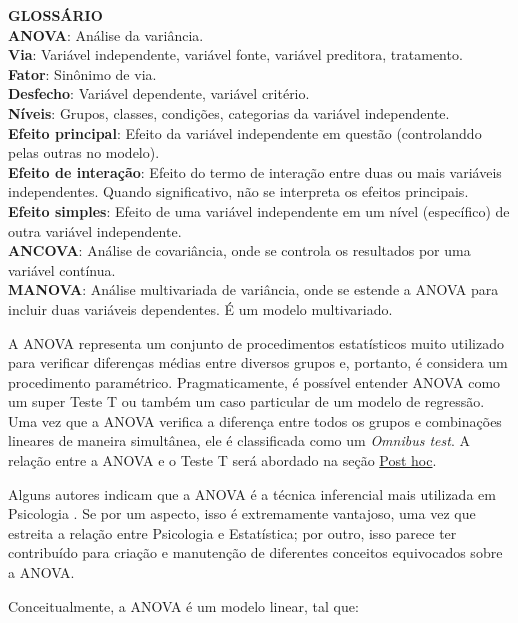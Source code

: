 \documentclass[
]{book}
\begin{document}
\begin{glossario}
\textbf{GLOSSÁRIO}\\
\textbf{ANOVA}: Análise da variância.\\
\textbf{Via}: Variável independente, variável fonte, variável preditora,
tratamento.\\
\textbf{Fator}: Sinônimo de via.\\
\textbf{Desfecho}: Variável dependente, variável critério.\\
\textbf{Níveis}: Grupos, classes, condições, categorias da variável
independente.\\
\textbf{Efeito principal}: Efeito da variável independente em questão
(controlanddo pelas outras no modelo).\\
\textbf{Efeito de interação}: Efeito do termo de interação entre duas ou
mais variáveis independentes. Quando significativo, não se interpreta os
efeitos principais.\\
\textbf{Efeito simples}: Efeito de uma variável independente em um nível
(específico) de outra variável independente.\\
\textbf{ANCOVA}: Análise de covariância, onde se controla os resultados
por uma variável contínua.\\
\textbf{MANOVA}: Análise multivariada de variância, onde se estende a
ANOVA para incluir duas variáveis dependentes. É um modelo multivariado.
\end{glossario}

A ANOVA representa um conjunto de procedimentos estatísticos muito utilizado para verificar diferenças médias entre diversos grupos e, portanto, é considera um procedimento paramétrico. Pragmaticamente, é possível entender ANOVA como um super Teste T ou também um caso particular de um modelo de regressão. Uma vez que a ANOVA verifica a diferença entre todos os grupos e combinações lineares de maneira simultânea, ele é classificada como um \emph{Omnibus test}. A relação entre a ANOVA e o Teste T será abordado na seção \protect\hyperlink{post-hoc}{Post hoc}.

Alguns autores indicam que a ANOVA é a técnica inferencial mais utilizada em Psicologia \citep{Chartier2008, Howell2011}. Se por um aspecto, isso é extremamente vantajoso, uma vez que estreita a relação entre Psicologia e Estatística; por outro, isso parece ter contribuído para criação e manutenção de diferentes conceitos equivocados sobre a ANOVA.

Conceitualmente, a ANOVA é um modelo linear, tal que:
\end{document}
